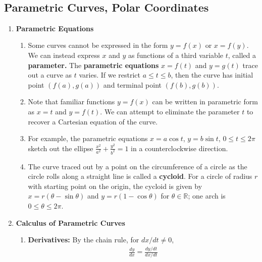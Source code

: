 \documentclass[10pt]{article}
\begin{document}
\date{}
\title{\vspace{-5ex}  \vspace{-5ex}}
\maketitle
\begin{multicols}{2}
\section{Parametric Curves, Polar Coordinates}
\begin{enumerate}
    \item \textbf{Parametric Equations} 
    \begin{enumerate}
         \item Some curves cannot be expressed in the form $y=f(x)$ or $x=f(y)$. We can instead express $x$ and $y$ as functions of a third variable $t$, called a \textbf{parameter.} The \textbf{parametric equations} $x = f(t)$ and $y=g(t)$ trace out a curve as $t$ varies. If we restrict $a \leq t \leq b$, then the curve has initial point $(f(a), g(a))$ and terminal point $(f(b), g(b))$.
         
         \item Note that familiar functions $y=f(x)$ can be written in parametric form as $x=t$ and $y=f(t)$. We can attempt to eliminate the parameter $t$ to recover a Cartesian equation of the curve.
         
         \item For example, the parametric equations $x = a\cos{t}$, $y = b\sin{t}$, $0 \leq t \leq 2\pi$ sketch out the ellipse $\frac{x^2}{a^2} + \frac{y^2}{b^2}=1$ in a counterclockwise direction.
         
         \item The curve traced out by a point on the circumference of a circle as the circle rolls along a straight line is called a \textbf{cycloid}. For a circle of radius $r$ with starting point on the origin, the cycloid is given by $x = r( \theta - \sin{\theta})$ and $y = r(1 - \cos{\theta})$ for $\theta \in \mathbb{R}$; one arch is $0 \leq \theta \leq 2\pi$.
    \end{enumerate}
    
    \item \textbf{Calculus of Parametric Curves}
    \begin{enumerate}
        \item \textbf{Derivatives:} By the chain rule, for $dx / dt \neq 0$,
        \begin{align*}
            \frac{dy}{dx} = \frac{dy / dt}{dx / dt}
        \end{align*}
        

\end{enumerate}
\end{enumerate}
\end{multicols}
\end{document}

